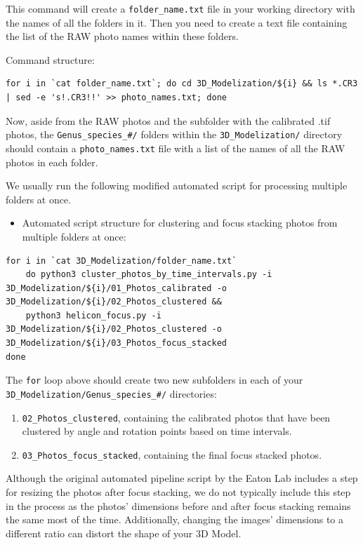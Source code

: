 \documentclass[
]{book}
\providecommand{\tightlist}{%
  \setlength{\itemsep}{0pt}\setlength{\parskip}{0pt}}
\begin{document}
This command will create a \texttt{folder\_name.txt} file in your working directory with the names of
all the folders in it. Then you need to create a text file containing the list of
the RAW photo names within these folders.

Command structure:

\begin{verbatim}
for i in `cat folder_name.txt`; do cd 3D_Modelization/${i} && ls *.CR3 | sed -e 's!.CR3!!' >> photo_names.txt; done
\end{verbatim}

Now, aside from the RAW photos and the subfolder with the calibrated .tif photos,
the \texttt{Genus\_species\_\#/} folders within the \texttt{3D\_Modelization/} directory should contain
a \texttt{photo\_names.txt} file with a list of the names of all the RAW photos in each folder.

We usually run the following modified automated script for processing multiple folders at once.

\begin{itemize}
\tightlist
\item
  Automated script structure for clustering and focus stacking photos from multiple folders at once:
\end{itemize}

\begin{verbatim}
for i in `cat 3D_Modelization/folder_name.txt`
    do python3 cluster_photos_by_time_intervals.py -i 3D_Modelization/${i}/01_Photos_calibrated -o 3D_Modelization/${i}/02_Photos_clustered &&
    python3 helicon_focus.py -i 3D_Modelization/${i}/02_Photos_clustered -o 3D_Modelization/${i}/03_Photos_focus_stacked
done
\end{verbatim}

The \texttt{for} loop above should create two new subfolders in each of
your \texttt{3D\_Modelization/Genus\_species\_\#/} directories:

\begin{enumerate}
\def\labelenumi{\arabic{enumi}.}
\item
  \texttt{02\_Photos\_clustered}, containing the calibrated photos that have been clustered
  by angle and rotation points based on time intervals.
\item
  \texttt{03\_Photos\_focus\_stacked}, containing the final focus stacked photos.
\end{enumerate}

Although the original automated pipeline script by the Eaton Lab includes a step
for resizing the photos after focus stacking, we do not typically include this step
in the process as the photos' dimensions before and after focus stacking remains the same
most of the time. Additionally, changing the images' dimensions to a different ratio
can distort the shape of your 3D Model.
\end{document}
